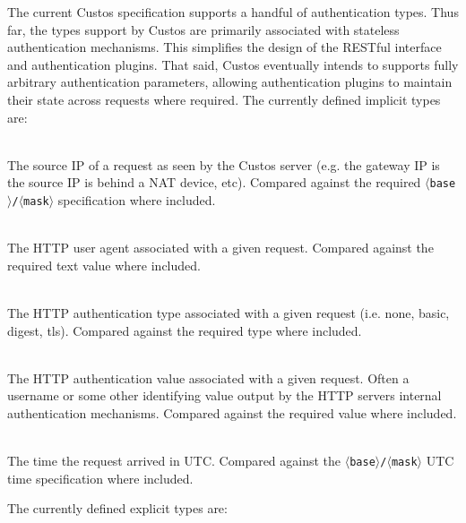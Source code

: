 The current Custos specification supports a handful of authentication
types. Thus far, the types support by Custos are primarily associated
with stateless authentication mechanisms. This simplifies the design
of the RESTful interface and authentication plugins. That said, Custos
eventually intends to supports fully arbitrary authentication
parameters, allowing authentication plugins to maintain their state
across requests where required. The currently defined implicit types
are:

\begin{packed_desc}
\item[\texttt{ip\_src}] \hfill \\ The source IP of a request as seen
  by the Custos server (e.g. the gateway IP is the source IP is behind
  a NAT device, etc). Compared against the required
  \texttt{$\langle$base$\rangle$/$\langle$mask$\rangle$} specification where
  included.
\item[\texttt{user\_agent}] \hfill \\ The HTTP user agent
  associated with a given request. Compared against the required text
  value where included.
\item[\texttt{auth\_type}] \hfill \\ The HTTP authentication type
  associated with a given request (i.e. none, basic, digest,
  tls). Compared against the required type where included.
\item[\texttt{auth\_value}] \hfill \\ The HTTP authentication value
  associated with a given request. Often a username or some other
  identifying value output by the HTTP servers internal authentication
  mechanisms. Compared against the required value where included.
\item[\texttt{time\_utc}] \hfill \\ The time the request arrived in
  UTC. Compared against the
  \texttt{$\langle$base$\rangle$/$\langle$mask$\rangle$} UTC time
  specification where included.
\end{packed_desc}

\noindent
The currently defined explicit types are:


